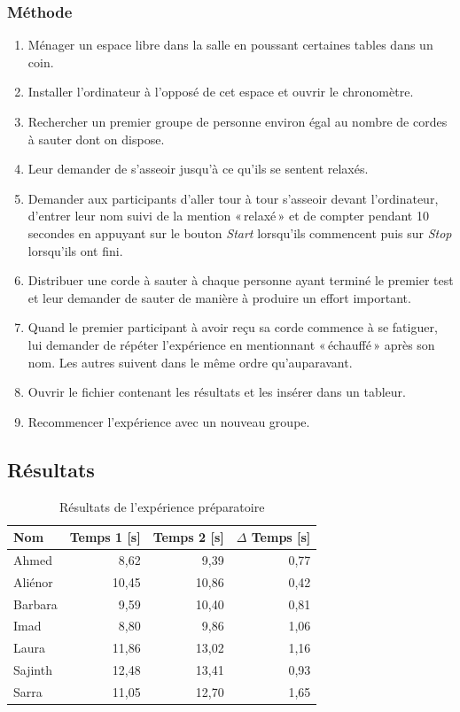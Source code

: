 \documentclass[12pt,fleqn,oneside,french,openany]{book} %
\begin{document}
\subsubsection{Méthode} \label{sssec:methode2.1}
\begin{enumerate}
	\item Ménager un espace libre dans la salle en poussant certaines tables dans un coin.
	\item Installer l'ordinateur à l'opposé de cet espace et ouvrir le chronomètre.
	\item Rechercher un premier groupe de personne environ égal au nombre de cordes à sauter dont on dispose.
	\item Leur demander de s'asseoir jusqu'à ce qu'ils se sentent relaxés.
	\item Demander aux participants d'aller tour à tour s'asseoir devant l'ordinateur, d'entrer leur nom suivi de la mention «\,relaxé\,» et de compter pendant 10 secondes en appuyant sur le bouton \emph{Start} lorsqu'ils commencent puis sur \emph{Stop} lorsqu'ils ont fini.
	\item Distribuer une corde à sauter à chaque personne ayant terminé le premier test et leur demander de sauter de manière à produire un effort important.
	\item Quand le premier participant à avoir reçu sa corde commence à se fatiguer, lui demander de répéter l'expérience en mentionnant «\,échauffé\,» après son nom. Les autres suivent dans le même ordre qu'auparavant.
	\item Ouvrir le fichier contenant les résultats et les insérer dans un tableur.
	\item Recommencer l'expérience avec un nouveau groupe.
\end{enumerate}

\subsection{Résultats} \label{ssec:resultats2.1}

\begin{table}[h]
	\centering
	\caption{Résultats de l'expérience préparatoire} \label{tbl:exp2.1}
	\begin{tabular}{lrrr}
		\toprule 
		\textbf{Nom} & \textbf{Temps 1 [s]} & \textbf{Temps 2 [s]} & \textbf{$\Delta$ Temps [s]} \\ \midrule
		Ahmed & 8,62 & 9,39 & 0,77 \\
		Aliénor & 10,45 & 10,86 & 0,42 \\
		Barbara & 9,59 & 10,40 & 0,81 \\
		Imad & 8,80 & 9,86 & 1,06 \\
		Laura & 11,86 & 13,02 & 1,16 \\
		Sajinth & 12,48 & 13,41 & 0,93 \\
		Sarra & 11,05 & 12,70 & 1,65 \\ \bottomrule
	\end{tabular}
\end{table}
\clearpage
\end{document}

